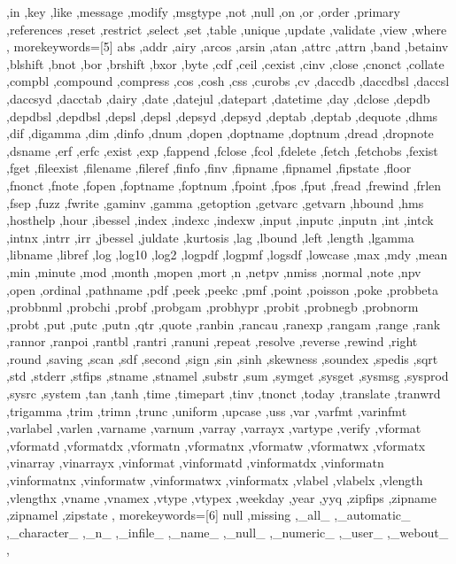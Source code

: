 {{    ,in ,key ,like ,message ,modify ,msgtype ,not ,null ,on ,or ,order
    ,primary ,references ,reset ,restrict ,select ,set ,table ,unique
    ,update ,validate ,view ,where
  },
  morekeywords=[5]{
    abs ,addr ,airy ,arcos ,arsin ,atan ,attrc ,attrn ,band ,betainv
    ,blshift ,bnot ,bor ,brshift ,bxor ,byte ,cdf ,ceil ,cexist ,cinv
    ,close ,cnonct ,collate ,compbl ,compound ,compress ,cos ,cosh ,css
    ,curobs ,cv ,daccdb ,daccdbsl ,daccsl ,daccsyd ,dacctab ,dairy
    ,date ,datejul ,datepart ,datetime ,day ,dclose ,depdb ,depdbsl
    ,depdbsl ,depsl ,depsl ,depsyd ,depsyd ,deptab ,deptab ,dequote
    ,dhms ,dif ,digamma ,dim ,dinfo ,dnum ,dopen ,doptname ,doptnum
    ,dread ,dropnote ,dsname ,erf ,erfc ,exist ,exp ,fappend ,fclose
    ,fcol ,fdelete ,fetch ,fetchobs ,fexist ,fget ,fileexist ,filename
    ,fileref ,finfo ,finv ,fipname ,fipnamel ,fipstate ,floor ,fnonct
    ,fnote ,fopen ,foptname ,foptnum ,fpoint ,fpos ,fput ,fread ,frewind
    ,frlen ,fsep ,fuzz ,fwrite ,gaminv ,gamma ,getoption ,getvarc
    ,getvarn ,hbound ,hms ,hosthelp ,hour ,ibessel ,index ,indexc
    ,indexw ,input ,inputc ,inputn ,int ,intck ,intnx ,intrr ,irr
    ,jbessel ,juldate ,kurtosis ,lag ,lbound ,left ,length ,lgamma
    ,libname ,libref ,log ,log10 ,log2 ,logpdf ,logpmf ,logsdf ,lowcase
    ,max ,mdy ,mean ,min ,minute ,mod ,month ,mopen ,mort ,n ,netpv
    ,nmiss ,normal ,note ,npv ,open ,ordinal ,pathname ,pdf ,peek ,peekc
    ,pmf ,point ,poisson ,poke ,probbeta ,probbnml ,probchi ,probf
    ,probgam ,probhypr ,probit ,probnegb ,probnorm ,probt ,put ,putc
    ,putn ,qtr ,quote ,ranbin ,rancau ,ranexp ,rangam ,range ,rank
    ,rannor ,ranpoi ,rantbl ,rantri ,ranuni ,repeat ,resolve ,reverse
    ,rewind ,right ,round ,saving ,scan ,sdf ,second ,sign ,sin ,sinh
    ,skewness ,soundex ,spedis ,sqrt ,std ,stderr ,stfips ,stname
    ,stnamel ,substr ,sum ,symget ,sysget ,sysmsg ,sysprod ,sysrc
    ,system ,tan ,tanh ,time ,timepart ,tinv ,tnonct ,today ,translate
    ,tranwrd ,trigamma ,trim ,trimn ,trunc ,uniform ,upcase ,uss ,var
    ,varfmt ,varinfmt ,varlabel ,varlen ,varname ,varnum ,varray
    ,varrayx ,vartype ,verify ,vformat ,vformatd ,vformatdx ,vformatn
    ,vformatnx ,vformatw ,vformatwx ,vformatx ,vinarray ,vinarrayx
    ,vinformat ,vinformatd ,vinformatdx ,vinformatn ,vinformatnx
    ,vinformatw ,vinformatwx ,vinformatx ,vlabel ,vlabelx ,vlength
    ,vlengthx ,vname ,vnamex ,vtype ,vtypex ,weekday ,year ,yyq ,zipfips
    ,zipname ,zipnamel ,zipstate
  },
  morekeywords=[6]{
    null ,missing ,_all_ ,_automatic_ ,_character_ ,_n_ ,_infile_
    ,_name_ ,_null_ ,_numeric_ ,_user_ ,_webout_
  },
}

